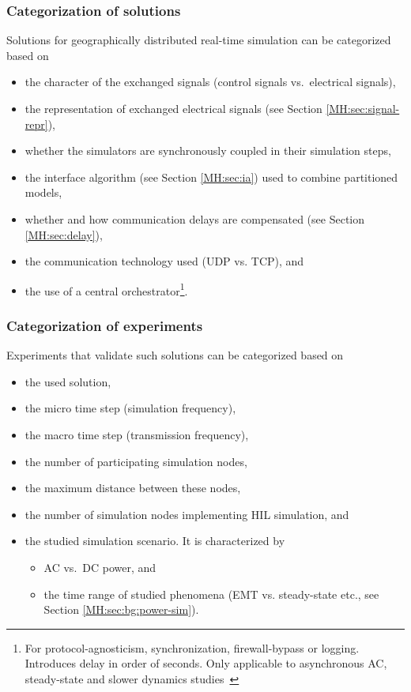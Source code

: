 \documentclass[a4paper]{atseminar}
\begin{document}
\subsubsection{Categorization of solutions}
\label{MH:sec:cat-sol}

Solutions for geographically distributed real-time simulation can be categorized based on

\begin{itemize}
    
    \item the character of the exchanged signals (control signals vs.~electrical signals),
    \item the representation of exchanged electrical signals (see Section \ref{MH:sec:signal-repr}),
    \item whether the simulators are synchronously coupled in their simulation steps,
    \item the interface algorithm (see Section \ref{MH:sec:ia}) used to combine partitioned models,
    \item whether and how communication delays are compensated (see Section \ref{MH:sec:delay}), 
    \item the communication technology used (UDP vs. TCP), and %
    \item the use of a central orchestrator\footnote{For protocol-agnosticism, synchronization, firewall-bypass or logging. Introduces delay in order of seconds. Only applicable to asynchronous AC, steady-state and slower dynamics studies~\cite{syed2020standard}}.

\end{itemize}

\subsubsection{Categorization of experiments}
\label{MH:sec:cat-exp}

Experiments that validate such solutions can be categorized based on

\begin{itemize}
    \item the used solution,
    \item the micro time step (simulation frequency),
    \item the macro time step (transmission frequency),
    \item the number of participating simulation nodes,
    \item the maximum distance between these nodes,
    \item the number of simulation nodes implementing HIL simulation, and
    \item the studied simulation scenario. It is characterized by
    \begin{itemize}
        \item AC vs.~DC power, and
        \item the time range of studied phenomena (EMT vs. steady-state etc., see Section \ref{MH:sec:bg:power-sim}).
    \end{itemize}
\end{itemize}
\end{document}

